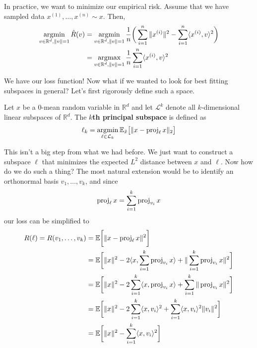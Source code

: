   In practice, we want to minimize our empirical risk. Assume that we have sampled data $x^{(1)}, \ldots, x^{(n)} \sim x$. Then, 
  \begin{align} 
    \operatorname*{\arg\!\min}_{v \in \mathbb{R}^{d}, \|v\| = 1} \hat{R}(v) 
    & =  \operatorname*{\arg\!\min}_{v \in \mathbb{R}^{d}, \|v\| = 1} \frac{1}{n} \bigg( \sum_{i = 1}^n \|x^{(i)} \|^2 - \sum_{i=1}^n \langle x^{(i)}, v \rangle^2 \bigg) \\ 
    & = \operatorname*{\arg\!\max}_{v \in \mathbb{R}^{d}, \|v\| = 1} \frac{1}{n} \sum_{i=1}^n \langle x^{(i)}, v \rangle^2 
  \end{align} 

  We have our loss function! Now what if we wanted to look for best fitting subspaces in general? Let's first rigorously define such a space. 

  \begin{definition} 
    Let $x$ be a $0$-mean random variable in $\mathbb{R}^d$ and let $\mathcal{L}^k$ denote all $k$-dimensional linear subspaces of $\mathbb{R}^d$. The \textbf{$k$th principal subspace} is defined as 
    \begin{equation}
      \ell_k = \operatorname*{\arg\!\min}_{\ell \in \mathcal{L}_k} \mathbb{E}_{\Tilde{x}} \big[ \| x - \operatorname{proj}_\ell x\|_2 \big]
    \end{equation}
  \end{definition}

  This isn't a big step from what we had before. We just want to construct a subspace $\ell$ that minimizes the expected $L^2$ distance between $x$ and $\ell$. Now how do we do such a thing? The most natural extension would be to identify an orthonormal basis $v_1, \ldots, v_k$, and since 
  \begin{equation}
    \operatorname{proj}_\ell x = \sum_{i=1}^k \operatorname{proj}_{v_i} x
  \end{equation} 
  our loss can be simplified to 
  \begin{align}
    R(\ell) = R(v_1, \ldots, v_k) 
    & = \mathbb{E} \bigg[ \| x - \operatorname{proj}_\ell x \|^2 \bigg] \\ 
    & = \mathbb{E} \bigg[ \|x\|^2 - 2 \langle x, \sum_{i=1}^k \operatorname{proj}_{v_i} x \rangle + \| \sum_{i=1}^k \operatorname{proj}_{v_i} x \|^2 \bigg] \\ 
    & = \mathbb{E} \bigg[ \|x\|^2 - 2 \sum_{i=1}^k \langle x, \operatorname{proj}_{v_i} x \rangle + \sum_{i=1}^k \| \operatorname{proj}_{v_i} x \|^2 \bigg] \\
    & = \mathbb{E} \bigg[ \|x\|^2 - 2 \sum_{i=1}^k \langle x, v_i \rangle^2 + \sum_{i=1}^k \langle x, v_i \rangle^2 \|v_i\|^2 \bigg] \\ 
    & = \mathbb{E} \bigg[ \|x\|^2 - \sum_{i=1}^k \langle x, v_i \rangle^2 \bigg] \label{loss}
  \end{align} 

